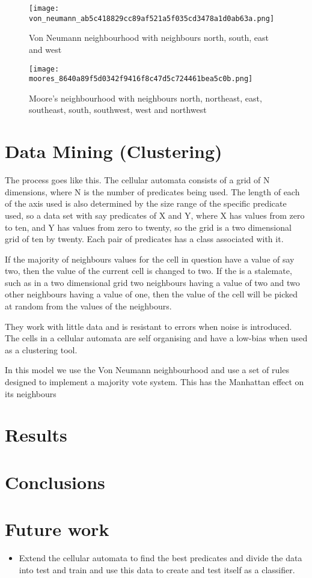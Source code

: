 \documentclass[11pt]{article}
\begin{document}
\begin{figure}[htb]
\centering
\texttt{[image: von\_neumann\_ab5c418829cc89af521a5f035cd3478a1d0ab63a.png]}
\caption{Von Neumann neighbourhood with neighbours north, south, east and west}
\end{figure}


\begin{figure}[htb]
\centering
\texttt{[image: moores\_8640a89f5d0342f9416f8c47d5c724461bea5c0b.png]}
\caption{Moore's neighbourhood with neighbours north, northeast, east, southeast, south, southwest, west and northwest}
\end{figure}
\section{Data Mining (Clustering)}
\label{sec-3}

  The process goes like this.  The cellular automata consists of a
  grid of N dimensions, where N is the number of predicates being
  used.  The length of each of the axis used is also determined by the
  size range of the specific predicate used, so a data set with say
  predicates of X and Y, where X has values from zero to ten, and Y
  has values from zero to twenty, so the grid is a two dimensional
  grid of ten by twenty.  Each pair of predicates has a class
  associated with it.  

  If the majority of neighbours values for the cell in question have a
  value of say two, then the value of the current cell is changed to
  two.  If the is a stalemate, such as in a two dimensional grid two
  neighbours having a value of two and two other neighbours having a
  value of one, then the value of the cell will be picked at random
  from the values of the neighbours. 
 
  They work with little data and is resistant to errors when noise is
  introduced.  The cells in a cellular automata are self organising
  and have a low-bias when used as a clustering tool.

  In this model we use the Von Neumann neighbourhood and use a set of
  rules designed to implement a majority vote system.  This has the
  Manhattan effect on its neighbours
\section{Results}
\label{sec-4}

  
\section{Conclusions}
\label{sec-5}

  
\section{Future work}
\label{sec-6}


\begin{itemize}
\item Extend the cellular automata to find the best predicates and divide
   the data into test and train and use this data to create and test
   itself as a classifier.
\end{itemize}



\end{document}
